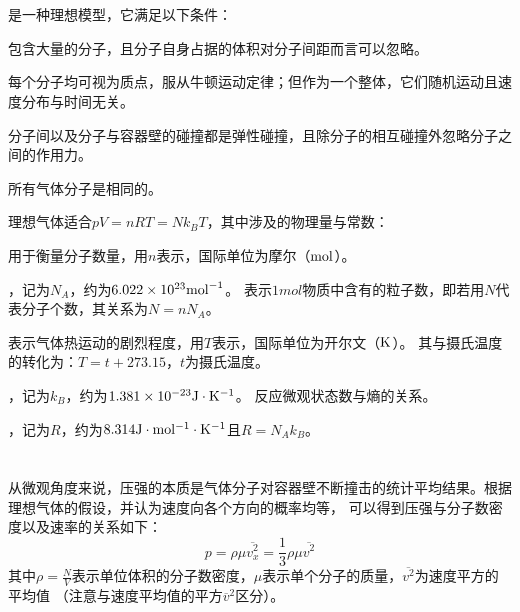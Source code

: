     \section[理想气体]{}
        是一种理想模型，它满足以下条件：
        \\
        \begin{Itemize}
            \item 包含大量的分子，且分子自身占据的体积对分子间距而言可以忽略。
            \item 每个分子均可视为质点，服从牛顿运动定律；但作为一个整体，它们随机运动且速度分布与时间无关。
            \item 分子间以及分子与容器壁的碰撞都是弹性碰撞，且除分子的相互碰撞外忽略分子之间的作用力。
            \item 所有气体分子是相同的。
        \end{Itemize}
        \newpage
        理想气体适合\quad$pV=nRT=Nk_{B}T$，其中涉及的物理量与常数：
        \\
        \begin{Itemize}
            \item {}用于衡量分子数量，用$n$表示，国际单位为摩尔（$\rm{mol}$）。
            \item {}，记为$N_{A}$，约为$6.022\times 10^{23}\rm{mol}^{-1}$。
            表示$1mol$物质中含有的粒子数，即若用$N$代表分子个数，其关系为$N=nN_{A}$。
            \item {}表示气体热运动的剧烈程度，用$T$表示，国际单位为开尔文（$\rm{K}$）。
            其与摄氏温度的转化为：$T = t + 273.15$，$t$为摄氏温度。
            \item {}，记为$k_{B}$，约为$1.381\times 10^{-23}\rm{J}\cdot K^{-1}$。
            反应微观状态数与熵的关系。
            \item {}，记为$R$，约为$8.314\rm{J}\cdot mol^{-1}\cdot K^{-1}$且$R=N_{A}k_{B}$。
        \end{Itemize}
    \section[分子动理论]{}
        \subsection[压强的微观解释]{}
            从微观角度来说，压强的本质是气体分子对容器壁不断撞击的统计平均结果。根据理想气体的假设，并认为速度向各个方向的概率均等，
            可以得到压强与分子数密度以及速率的关系如下：
            \begin{equation}
                p = \rho \mu \overline{v_{x}^{2}}=\frac{1}{3}\rho \mu \overline{v^{2}}
                \nonumber
            \end{equation}
            其中$\rho = \frac{N}{V}$表示单位体积的分子数密度，$\mu$表示单个分子的质量，$\overline{v^{2}}$为速度平方的平均值
            （注意与速度平均值的平方$\overline{v}^2$区分）。

